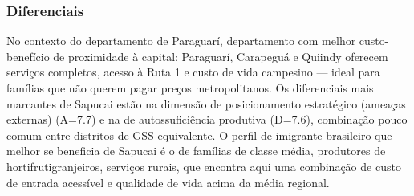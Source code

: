 \subsubsection*{Diferenciais}\label{dif-sapucai-0913}
No contexto do departamento de Paraguarí, departamento com melhor custo-benefício de proximidade à capital: Paraguarí, Carapeguá e Quiindy oferecem serviços completos, acesso à Ruta 1 e custo de vida campesino — ideal para famílias que não querem pagar preços metropolitanos. Os diferenciais mais marcantes de Sapucai estão na dimensão de posicionamento estratégico (ameaças externas) (A=7.7) e na de autossuficiência produtiva (D=7.6), combinação pouco comum entre distritos de GSS equivalente. O perfil de imigrante brasileiro que melhor se beneficia de Sapucai é o de famílias de classe média, produtores de hortifrutigranjeiros, serviços rurais, que encontra aqui uma combinação de custo de entrada acessível e qualidade de vida acima da média regional.
